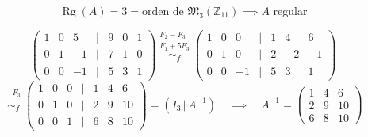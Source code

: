\documentclass[a4paper,12pt]{article}
\begin{document}
\begin{ejercicio}[title=Ejercicio 13]
\[\operatorname{Rg}(A) = 3 = \text{orden de } \mathfrak{M}_3(\mathbb{Z}_{11}) \implies \boxed{\text{$A$ regular}}
\]

\[
\begin{pmatrix}
1 & 0 & 5 &\Big|& 9 & 0 & 1\\
0 & 1 & -1 &\Big|& 7 & 1 & 0\\
0 & 0 & -1 &\Big|& 5 & 3 & 1
\end{pmatrix}
\overset{\substack{F_2 - F_3 \\ F_1 + 5F_3}}{\sim_f}
\begin{pmatrix}
1 & 0 & 0 &\Big|& 1 & 4 & 6\\
0 & 1 & 0 &\Big|& 2 & -2 & -1\\
0 & 0 & -1 &\Big|& 5 & 3 & 1
\end{pmatrix}
\]
\vspace{0.5em}
\[
\overset{\substack{-F_3 \\ {}}}{\sim_f}
\begin{pmatrix}
1 & 0 & 0 &\Big|& 1 & 4 & 6\\
0 & 1 & 0 &\Big|& 2 & 9 & 10\\
0 & 0 & 1 &\Big|& 6 & 8 & 10
\end{pmatrix}
= (I_3 \, | \, A^{-1})
\quad \implies \quad
\boxed{
A^{-1} =
\begin{pmatrix}
1 & 4 & 6\\
2 & 9 & 10\\
6 & 8 & 10
\end{pmatrix}
}
\]
\end{ejercicio}
\end{document}
